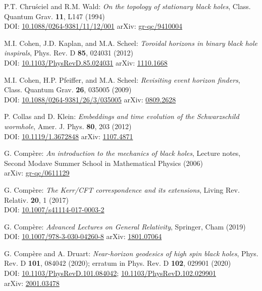 \begin{thebibliography}{123}
P.T. Chru\'sciel and R.M. Wald:
{\em On the topology of stationary black holes},
Class. Quantum Grav. {\bf 11}, L147 (1994)\\
DOI: \href{https://doi.org/10.1088/0264-9381/11/12/001}{10.1088/0264-9381/11/12/001}\hfill
arXiv: \href{https://arxiv.org/abs/gr-qc/9410004}{gr-qc/9410004}

M.I. Cohen, J.D. Kaplan, and M.A. Scheel:
{\em Toroidal horizons in binary black hole inspirals},
Phys. Rev. D {\bf 85}, 024031 (2012)\\
DOI: \href{https://doi.org/10.1103/PhysRevD.85.024031}{10.1103/PhysRevD.85.024031}\hfill
arXiv: \href{https://arxiv.org/abs/1110.1668}{1110.1668}

M.I. Cohen, H.P. Pfeiffer, and M.A. Scheel:
{\em Revisiting event horizon finders},
Class. Quantum Grav. {\bf 26}, 035005 (2009)\\
DOI: \href{https://doi.org/10.1088/0264-9381/26/3/035005}{10.1088/0264-9381/26/3/035005}\hfill
arXiv: \href{https://arxiv.org/abs/0809.2628}{0809.2628}

P. Collas and D. Klein:
{\em Embeddings and time evolution of the Schwarzschild wormhole},
Amer. J. Phys. {\bf 80}, 203 (2012)\\
DOI: \href{https://doi.org/10.1119/1.3672848}{10.1119/1.3672848}\hfill
arXiv: \href{https://arxiv.org/abs/1107.4871}{1107.4871}

G. Compère:
{\em An introduction to the mechanics of black holes},
Lecture notes, Second Modave Summer School in Mathematical Physics (2006)\\
arXiv: \href{https://arxiv.org/abs/gr-qc/0611129}{gr-qc/0611129}

G. Compère:
{\em The Kerr/CFT correspondence and its extensions},
Living Rev. Relativ. {\bf 20}, 1 (2017)\\
DOI: \href{https://doi.org/10.1007/s41114-017-0003-2}{10.1007/s41114-017-0003-2}

G. Compère:
{\em Advanced Lectures on General Relativity},
Springer, Cham (2019)\\
DOI: \href{https://doi.org/10.1007/978-3-030-04260-8}{10.1007/978-3-030-04260-8}\hfill
arXiv: \href{https://arxiv.org/abs/1801.07064}{1801.07064}

G. Compère and A. Druart:
{\em Near-horizon geodesics of high spin black holes},
Phys. Rev. D {\bf 101}, 084042 (2020); erratum in Phys. Rev. D {\bf 102}, 029901 (2020)\\
DOI: \href{https://doi.org/10.1103/PhysRevD.101.084042}{10.1103/PhysRevD.101.084042};
\href{https://doi.org/10.1103/PhysRevD.102.029901}{10.1103/PhysRevD.102.029901}\\
arXiv: \href{https://arxiv.org/abs/2001.03478}{2001.03478}


\end{thebibliography}
